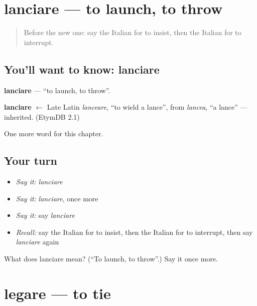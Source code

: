 \section[lanciare]{lanciare — to launch, to throw}

\label{lesson:IT-C183-lanciare}



\begin{quote}
Before the new one: say the Italian for to insist, then the Italian for to interrupt.
\end{quote}

\subsection*{You'll want to know: lanciare}
\textbf{lanciare} — \textquotedblleft{}to launch, to throw\textquotedblright{}.

\begin{cousinweb}
\textbf{lanciare} $\leftarrow$ Late Latin \emph{lanceare}, \textquotedblleft{}to wield a lance\textquotedblright{}, from \emph{lancea}, \textquotedblleft{}a lance\textquotedblright{} — inherited. (EtymDB 2.1)
\end{cousinweb}

\begin{grammarlens}[title={What you've built}]
One more word for this chapter.
\end{grammarlens}

\subsection*{Your turn}
\begin{itemize}
\raggedright
  \item \emph{Say it:} \emph{lanciare}
  \item \emph{Say it:} \emph{lanciare}, once more
  \item \emph{Say it:} say \emph{lanciare}
  \item \emph{Recall:} say the Italian for to insist, then the Italian for to interrupt, then say \emph{lanciare} again
\end{itemize}

\begin{tcolorbox}[breakable,colback=teal!4,colframe=teal!35!black,title={Before you move on}]
What does lanciare mean? (\textquotedblleft{}To launch, to throw\textquotedblright{}.) Say it once more.
\end{tcolorbox}
\section[legare]{legare — to tie}


